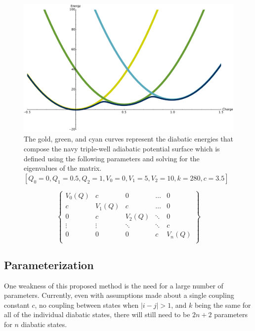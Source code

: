 \begin{figure}
  \centering
  \includegraphics[width=0.75\linewidth]{../figures/chap5/multipleDiabats.pdf}
  \caption{The gold, green, and cyan curves represent the diabatic energies
that compose the navy triple-well adiabatic potential surface which is defined
using the following parameters and solving for the eigenvalues of the matrix.
$[Q_0 = 0, Q_1 = 0.5, Q_2 = 1, V_0 = 0, V_1 = 5, V_2 = 10, k = 280, c = 3.5]$}
\label{fig:multipleDiabat}
\end{figure}

\begin{equation*}
  \begin{Bmatrix}
    V_0(Q) & c      & 0      & \dots  & 0\\
    c      & V_1(Q) & c      & \dots & 0\\
    0      & c      & V_2(Q) & \ddots & 0 \\
    \vdots & \vdots & \ddots & \ddots & c\\
    0      & 0      & 0      &  c     & V_n(Q) \\
    \end{Bmatrix}
\end{equation*}

\subsection{Parameterization}
One weakness of this proposed method is the need for a large number of
parameters.  Currently, even with assumptions made about a single coupling
constant $c$, no coupling between states when $|i-j| > 1$, and $k$ being the
same for all of the individual diabatic states, there will still need to be
$2n+2$ parameters for $n$ diabatic states. 


